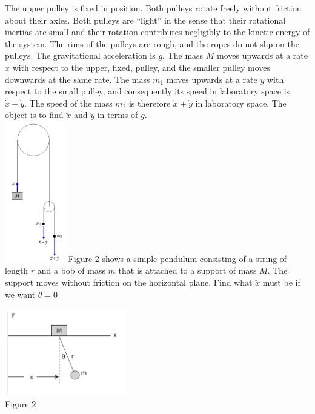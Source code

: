 \documentclass{exam}
\begin{document}
\begin{questions}
\begin{center}
        \end{center}\vspace{2in}
        \question The upper pulley is fixed in position. Both pulleys rotate freely without friction about their axles. 
        Both pulleys are “light” in the sense that their rotational inertias are small and their rotation 
        contributes negligibly to the kinetic energy of the system. The rims of the pulleys are rough, 
        and the ropes do not slip on the pulleys. The gravitational acceleration is $g$. 
        The mass $M$ moves upwards at a rate  $\dot{x}$ with respect to the upper, fixed, pulley, 
        and the smaller pulley moves downwards at the same rate. The mass $m_1$ moves upwards at a rate  
        $\dot{y}$ with respect to the small pulley, and consequently its speed in laboratory space is  
        $\dot{x}-\dot{y}$. The speed of the mass $m_2$ is therefore $\dot{x}+\dot{y}$ in laboratory space. 
        The object is to find  $\ddot{x}$ and  $\ddot{y}$ in terms of  $g$.\\
        \includegraphics[width=100px]{../assets/figure2.png}
        \question Figure 2 shows a simple pendulum consisting of a string of length $r$ and a bob of mass $m$ that
is attached to a support of mass $M$. The support moves without friction on the horizontal plane. Find what $\ddot{x}$ must be if we want $\ddot{\theta}=0$
        \begin{center}\includegraphics[width=200px]{../assets/figure3.png} \\Figure 2\end{center}
    \end{questions}
\end{document}
